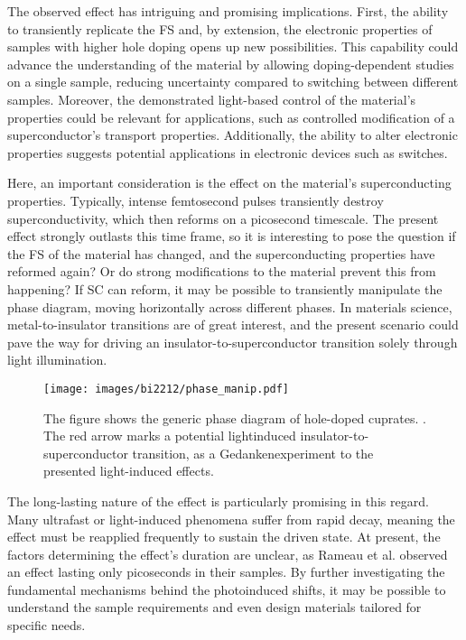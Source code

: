 The observed effect has intriguing and promising implications.
First, the ability to transiently replicate the FS and, by extension, the electronic properties of samples with higher hole doping opens up new possibilities.
This capability could advance the understanding of the material by allowing doping-dependent studies on a single sample, reducing uncertainty compared to switching between different samples.
Moreover, the demonstrated light-based control of the material's properties could be relevant for applications, such as controlled modification of a superconductor’s transport properties.
Additionally, the ability to alter electronic properties suggests potential applications in electronic devices such as switches.

Here, an important consideration is the effect on the material’s superconducting properties.
Typically, intense femtosecond pulses transiently destroy superconductivity, which then reforms on a picosecond timescale.
The present effect strongly outlasts this time frame, so it is interesting to pose the question if the FS of the material has changed, and the superconducting properties have reformed again?
Or do strong modifications to the material prevent this from happening?
If SC can reform, it may be possible to transiently manipulate the phase diagram, moving horizontally across different phases.
In materials science, metal-to-insulator transitions are of great interest, and the present scenario could pave the way for driving an insulator-to-superconductor transition solely through light illumination.

\begin{figure}
	\centering
	\texttt{[image: images/bi2212/phase\_manip.pdf]}
	\caption{The figure shows the generic phase diagram of hole-doped cuprates. \cite{keimer_quantum_2015}. The red arrow marks a potential lightinduced insulator-to-superconductor transition, as a Gedankenexperiment to the presented light-induced effects.}
	\label{fig:phasemanip}
\end{figure}

The long-lasting nature of the effect is particularly promising in this regard.
Many ultrafast or light-induced phenomena suffer from rapid decay, meaning the effect must be reapplied frequently to sustain the driven state.
At present, the factors determining the effect’s duration are unclear, as Rameau et al. \cite{rameau_photoinduced_2014} observed an effect lasting only picoseconds in their samples.
By further investigating the fundamental mechanisms behind the photoinduced shifts, it may be possible to understand the sample requirements and even design materials tailored for specific needs.